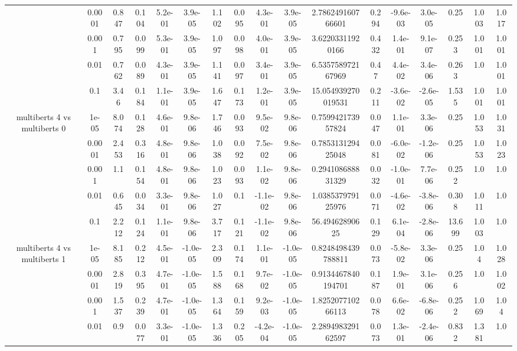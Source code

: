 \begin{tabular}{|c|c|c|c|c|c|c|c|c|c|c|c|c|c|c|c|c|}
 & 0.0001 & 0.847 & 0.104 & 5.2e-01 & 3.9e-05 & 1.102 & 0.095 & 4.3e-01 & 3.9e-05 & 2.786249160766601 & 0.294 & -9.6e-03 & 3.0e-05 & 0.25 & 1.003 & 1.017 \\
 & 0.001 & 0.795 & 0.099 & 5.3e-01 & 3.9e-05 & 1.097 & 0.098 & 4.0e-01 & 3.9e-05 & 3.62203311920166 & 0.432 & 1.4e-01 & 9.1e-07 & 0.253 & 1.001 & 1.001 \\
 & 0.01 & 0.762 & 0.089 & 4.3e-01 & 3.9e-05 & 1.141 & 0.097 & 3.4e-01 & 3.9e-05 & 6.535758972167969 & 0.47 & 4.4e-02 & 3.4e-06 & 0.263 & 1.0 & 1.001 \\
 & 0.1 & 3.46 & 0.184 & 1.1e-01 & 3.9e-05 & 1.647 & 0.173 & 1.2e-01 & 3.9e-05 & 15.054939270019531 & 0.211 & -3.6e-02 & -2.6e-05 & 1.535 & 1.001 & 1.001 \\
\hline
\multirow{5}{*}{multiberts 4 vs multiberts 0} & 1e-05 & 8.074 & 0.128 & 4.6e-01 & 9.8e-06 & 1.746 & 0.093 & 9.5e-02 & 9.8e-06 & 0.759942173957824 & 0.047 & 1.1e-01 & 3.3e-06 & 0.25 & 1.053 & 1.031 \\
 & 0.0001 & 2.453 & 0.316 & 4.8e-01 & 9.8e-06 & 1.038 & 0.092 & 7.5e-02 & 9.8e-06 & 0.785313129425048 & 0.081 & -6.0e-02 & -1.2e-06 & 0.25 & 1.053 & 1.023 \\
 & 0.001 & 1.1 & 0.154 & 4.8e-01 & 9.8e-06 & 1.023 & 0.093 & 1.1e-02 & 9.8e-06 & 0.294108688831329 & 0.032 & -1.0e-01 & 7.7e-06 & 0.252 & 1.0 & 1.0 \\
 & 0.01 & 0.645 & 0.034 & 3.3e-01 & 9.8e-06 & 1.027 & 0.1 & -1.1e-02 & 9.8e-06 & 1.038537979125976 & 0.071 & -4.6e-02 & -3.8e-06 & 0.308 & 1.011 & 1.0 \\
 & 0.1 & 2.212 & 0.124 & 1.1e-01 & 9.8e-06 & 3.717 & 0.121 & -1.1e-02 & 9.8e-06 & 56.49462890625 & 0.129 & 6.1e-04 & -2.8e-06 & 13.699 & 1.003 & 1.0 \\
\hline
\multirow{5}{*}{multiberts 4 vs multiberts 1} & 1e-05 & 8.185 & 0.212 & 4.5e-01 & -1.0e-05 & 2.309 & 0.174 & 1.1e-01 & -1.0e-05 & 0.8248498439788811 & 0.073 & -5.8e-02 & 3.3e-06 & 0.25 & 1.04 & 1.028 \\
 & 0.0001 & 2.819 & 0.395 & 4.7e-01 & -1.0e-05 & 1.588 & 0.168 & 9.7e-02 & -1.0e-05 & 0.9134467840194701 & 0.187 & 1.9e-01 & 3.1e-06 & 0.256 & 1.0 & 1.002 \\
 & 0.001 & 1.537 & 0.239 & 4.7e-01 & -1.0e-05 & 1.364 & 0.159 & 9.2e-03 & -1.0e-05 & 1.825207710266113 & 0.078 & 6.6e-02 & -6.8e-06 & 0.252 & 1.069 & 1.04 \\
 & 0.01 & 0.9 & 0.077 & 3.3e-01 & -1.0e-05 & 1.336 & 0.205 & -4.2e-04 & -1.0e-05 & 2.289498329162597 & 0.073 & 1.3e-01 & -2.4e-06 & 0.832 & 1.381 & 1.0 \\

\end{tabular}
